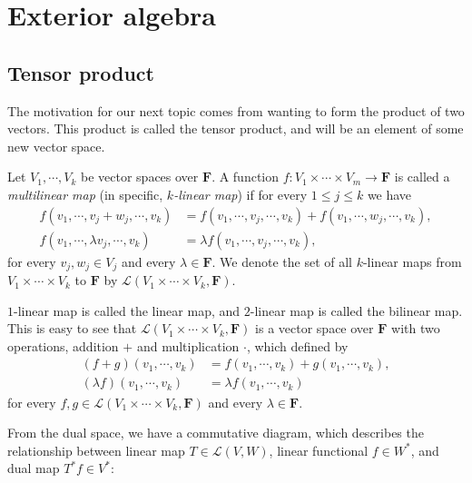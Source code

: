 
\chapter{Exterior algebra}

\section{Tensor product}\label{sec:tensor product}

The motivation for our next topic comes from wanting to form the product of two vectors. This product is called the tensor product, and will be an element of some new vector space.

\begin{definition}
    Let $V_1, \cdots, V_k$ be vector spaces over $\mathbf{F}$. A function $f : V_1 \times \cdots \times V_m \to \mathbf{F}$ is called a \emph{multilinear map} (in specific, \emph{$k$-linear map}) if for every $1 \leq j \leq k$ we have
    \begin{align*}
        f(v_1, \cdots, v_j + w_j, \cdots, v_k)
        &= f(v_1, \cdots, v_j, \cdots, v_k) + f(v_1, \cdots,w_j, \cdots, v_k),\\
        f(v_1, \cdots, \lambda v_j, \cdots, v_k)
        &= \lambda f(v_1, \cdots, v_j, \cdots, v_k),
    \end{align*}
for every $v_j, w_j \in V_j$ and every $\lambda \in \mathbf{F}$. We denote the set of all $k$-linear maps from $V_1 \times \cdots \times V_k$ to $\mathbf{F}$ by $\mathcal{L}(V_1\times \cdots \times V_k, \mathbf{F})$.
\end{definition}

\begin{remark}
    $1$-linear map is called the linear map, and $2$-linear map is called the bilinear map. This is easy to see that $\mathcal{L}(V_1 \times \cdots \times V_k, \mathbf{F})$ is a vector space over $\mathbf{F}$ with two operations, addition $+$ and multiplication $\cdot$, which defined by
    \begin{align*}
        (f + g)(v_1, \cdots, v_k) &= f(v_1, \cdots, v_k) + g(v_1, \cdots, v_k),\\
        (\lambda f)(v_1, \cdots, v_k) &= \lambda f(v_1, \cdots, v_k)
    \end{align*}
for every $f, g \in \mathcal{L}(V_1 \times \cdots \times V_k, \mathbf{F})$ and every $\lambda \in \mathbf{F}$.
\end{remark}

From the dual space, we have a commutative diagram, which describes the relationship between linear map $T \in \mathcal{L}(V, W)$, linear functional $f \in W^*$, and dual map $T^*f \in V^*$:

